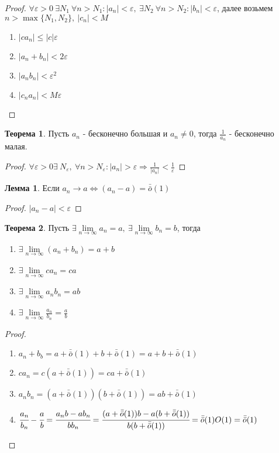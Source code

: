 \documentclass[a4paper, 12pt]{article}
\renewcommand{\epsilon}{\varepsilon}
\newcommand{\lra}{\Leftrightarrow}
\newcommand{\lims}{\lim\limits_{n\to \infty}}
\newcommand{\om}{\bar{\bar{o}}}
\theoremstyle{definition}
\newtheorem*{theorem}{Теорема}
\newtheorem*{lemma}{Лемма}
\begin{document}
        \begin{proof}
            $\forall \epsilon>0\ \exists N_1\ \forall n>N_1: |a_n|<\epsilon,\ \exists N_2\ \forall n>N_2: |b_n|<\epsilon$, далее возьмем $n>\max\{N_1,N_2\},\ |c_n|<M$
            \begin{enumerate}
                \item $|c a_n|\leq|c|\epsilon$
                \item $|a_n+b_n|<2\epsilon$
                \item $|a_nb_n|<\epsilon^2$
                \item $|c_na_n|<M\epsilon$
            \end{enumerate}
        \end{proof} 
        \begin{theorem}
            Пусть $a_n$ - бесконечно большая и $a_n\ne 0$, тогда $\frac{1}{a_n}$ - бесконечно малая.
        \end{theorem} 
        \begin{proof}
            $\forall \epsilon>0 \exists\ N_{\epsilon},\ \forall n>N_{\epsilon}: |a_n|>\epsilon \Rightarrow \frac{1}{|a_n|}<\frac{1}{\epsilon}$
        \end{proof} 
        \begin{lemma}
            Если $a_n\to a \lra (a_n-a)=\om(1)$
        \end{lemma} 
        \begin{proof}
            $|a_n-a|<\epsilon$
        \end{proof} 
        \begin{theorem}
            Пусть $\exists \lims a_n=a,\ \exists \lims b_n=b$, тогда
            \begin{enumerate}
                \item $\exists \lims (a_n+b_n)=a+b$
                \item $\exists \lims ca_n=ca$
                \item $\exists \lims a_nb_n=ab$
                \item $\exists \lims \frac{a_n}{b_n}=\frac{a}{b}$
            \end{enumerate}
        \end{theorem} 
        \begin{proof}
            \begin{enumerate}
                \item $a_n+b_b=a+\om(1)+b+\om(1)=a+b+\om(1)$
                \item $ca_n=c(a+\om(1))=ca+\om(1)$
                \item $a_nb_n=(a+\om(1))(b+\om(1))=ab+\om(1)$
                \item $\cfrac{a_n}{b_n}-\cfrac{a}{b}=\cfrac{a_nb-ab_n}{bb_n}=\cfrac{(a+\om(1))b-a(b+\om(1))}{b(b+\om(1))}=\om(1)O(1)=\om(1)$
            \end{enumerate}
        \end{proof}
\end{document}
